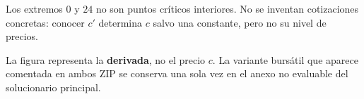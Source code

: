 \documentclass[11pt]{article}
\begin{document}
Los extremos $0$ y $24$ no son puntos críticos interiores. No se inventan cotizaciones concretas: conocer $c'$ determina $c$ salvo una constante, pero no su nivel de precios.
\begin{center}\end{center}
La figura representa la \textbf{derivada}, no el precio $c$. La variante bursátil que aparece comentada en ambos ZIP se conserva una sola vez en el anexo no evaluable del solucionario principal.
\end{document}
